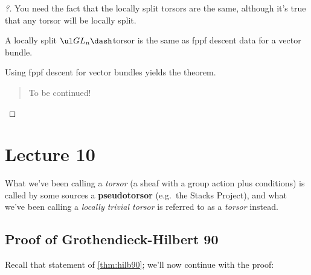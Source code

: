 \begin{proof}[?]

You need the fact that the locally split torsors are the same, although
it's true that any torsor will be locally split.

\begin{claim}

A locally split \(\ul GL_n\dash\)torsor is the same as fppf descent data
for a vector bundle.

\end{claim}

Using fppf descent for vector bundles yields the theorem.

\begin{quote}
To be continued!
\end{quote}

\end{proof}

\hypertarget{lecture-10}{%
\section{Lecture 10}\label{lecture-10}}

\begin{remark}

What we've been calling a \emph{torsor} (a sheaf with a group action
plus conditions) is called by some sources a \textbf{pseudotorsor}
(e.g.~the Stacks Project), and what we've been calling a \emph{locally
trivial torsor} is referred to as a \emph{torsor} instead.

\end{remark}

\hypertarget{proof-of-grothendieck-hilbert-90}{%
\subsection{Proof of Grothendieck-Hilbert
90}\label{proof-of-grothendieck-hilbert-90}}

Recall that statement of \cref{thm:hilb90}; we'll now continue with the
proof:

